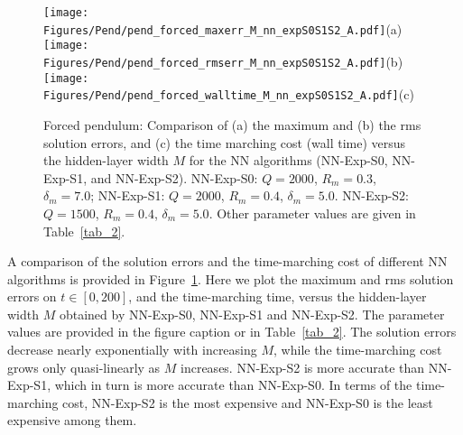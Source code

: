 \begin{figure}
  \centerline{
    \texttt{[image: Figures/Pend/pend\_forced\_maxerr\_M\_nn\_expS0S1S2\_A.pdf]}(a)
    \texttt{[image: Figures/Pend/pend\_forced\_rmserr\_M\_nn\_expS0S1S2\_A.pdf]}(b)
    \texttt{[image: Figures/Pend/pend\_forced\_walltime\_M\_nn\_expS0S1S2\_A.pdf]}(c)
  }
  \caption{Forced pendulum:
    Comparison of (a) the maximum and (b) the rms solution errors,
    and (c) the time marching cost (wall
    time) versus the hidden-layer width $M$ for
    the NN algorithms (NN-Exp-S0, NN-Exp-S1, and NN-Exp-S2).
    NN-Exp-S0: $Q=2000$, $R_m=0.3$, $\delta_m=7.0$;
    NN-Exp-S1: $Q=2000$, $R_m=0.4$, $\delta_m=5.0$.
    NN-Exp-S2: $Q=1500$, $R_m=0.4$, $\delta_m=5.0$.
    Other parameter values are given in Table~\ref{tab_2}.
  }
  \label{fg_14}
\end{figure}

A comparison of the solution errors and the time-marching cost of different NN algorithms
is provided in Figure~\ref{fg_14}. Here we plot the maximum and rms solution errors
on $t\in[0,200]$, and the time-marching time,
versus the hidden-layer width $M$
obtained by NN-Exp-S0, NN-Exp-S1 and NN-Exp-S2.
The parameter values are provided in the figure caption or in
Table~\ref{tab_2}.
The solution errors decrease nearly exponentially
with increasing  $M$, while the time-marching cost grows
only quasi-linearly as $M$ increases.
NN-Exp-S2 is more accurate than NN-Exp-S1, which in turn
is more accurate than NN-Exp-S0.
In terms of the time-marching cost, NN-Exp-S2 is the most expensive
and NN-Exp-S0 is the least expensive among them.



